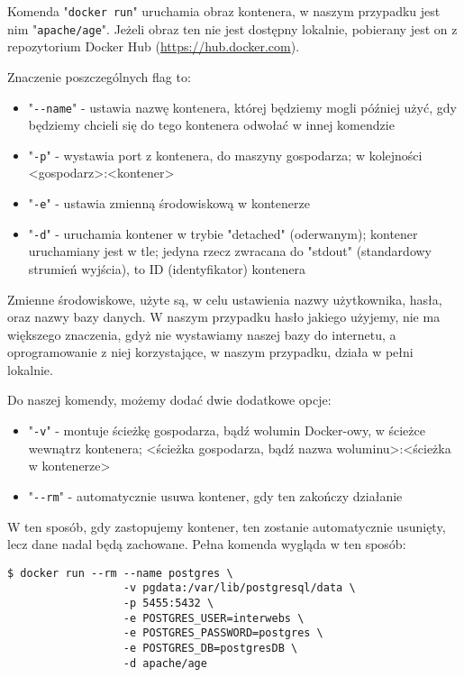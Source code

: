 \documentclass[a4paper, 12pt]{article}
\begin{document}
Komenda "\lstinline{docker run}" uruchamia obraz kontenera, w naszym przypadku jest nim "\lstinline{apache/age}". Jeżeli obraz ten nie jest dostępny lokalnie, pobierany jest on z repozytorium Docker Hub (\url{https://hub.docker.com}).

Znaczenie poszczególnych flag to:
\begin{itemize}
 \item "\lstinline{--name}" - ustawia nazwę kontenera, której będziemy mogli później użyć, gdy będziemy chcieli się do tego kontenera odwołać w innej komendzie
 \item "\lstinline{-p}" - wystawia port z kontenera, do maszyny gospodarza; w kolejności <gospodarz>:<kontener>
 \item "\lstinline{-e}" - ustawia zmienną środowiskową w kontenerze
 \item "\lstinline{-d}" - uruchamia kontener w trybie "detached" (oderwanym); kontener uruchamiany jest w tle; jedyna rzecz zwracana do "stdout" (standardowy strumień wyjścia), to ID (identyfikator) kontenera
\end{itemize}\cite{dockerRun}

Zmienne środowiskowe, użyte są, w celu ustawienia nazwy użytkownika, hasła, oraz nazwy bazy danych. W naszym przypadku hasło jakiego użyjemy, nie ma większego znaczenia, gdyż nie wystawiamy naszej bazy do internetu, a oprogramowanie z niej korzystające, w naszym przypadku, działa w pełni lokalnie.

Do naszej komendy, możemy dodać dwie dodatkowe opcje:
\begin{itemize}
 \item "\lstinline{-v}" - montuje ścieżkę gospodarza, bądź wolumin Docker-owy, w ścieżce wewnątrz kontenera; <ścieżka gospodarza, bądź nazwa woluminu>:<ścieżka w kontenerze>
 \item "\lstinline{--rm}" - automatycznie usuwa kontener, gdy ten zakończy działanie
\end{itemize}\cite{dockerRun}

W ten sposób, gdy zastopujemy kontener, ten zostanie automatycznie usunięty, lecz dane nadal będą zachowane.
Pełna komenda wygląda w ten sposób:
\begin{lstlisting}
$ docker run --rm --name postgres \
                  -v pgdata:/var/lib/postgresql/data \
                  -p 5455:5432 \
                  -e POSTGRES_USER=interwebs \
                  -e POSTGRES_PASSWORD=postgres \
                  -e POSTGRES_DB=postgresDB \
                  -d apache/age
\end{lstlisting}
\end{document}
